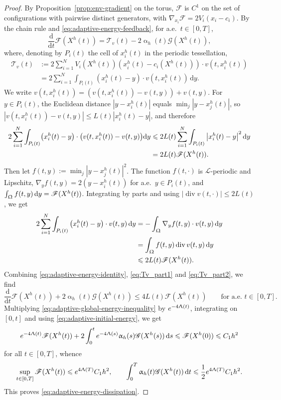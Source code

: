 \documentclass[letterpaper,11pt,twoside]{article}
\numberwithin{figure}{section}
\numberwithin{table}{section}
\theoremstyle{cpamplain}
\theoremstyle{cpamdefinition}
\newcommand{\diff}{\mathrm{d}}
\let\alpha\upalpha
\let\Lambda\Uplambda
\let\Omega\Upomega
\renewcommand{\le}{\leqslant}
\numberwithin{equation}{section}
\begin{document}
\begin{proof}
By Proposition~\ref{prop:env-gradient} on the torus, $\mathscr F$ is $C^1$ on the set of configurations with pairwise distinct generators, with $\nabla_{x_i}\mathscr F=2V_i(x_i-c_i)$.
By the chain rule and \eqref{eq:adaptive-energy-feedback}, for a.e.\ $t\in[0,T]$,
\begin{equation}\label{eq:adaptive-energy-identity}
\frac{\diff}{\diff t}\mathscr F(X^h(t))
=\mathscr T_v(t)-2\alpha_h(t)\mathscr G(X^h(t)),
\end{equation}
where, denoting by $P_i(t)$ the cell of $x_i^h(t)$ in the periodic tessellation,
\begin{align*}
\mathscr T_v(t)&:=2\sum_{i=1}^N V_i(X^h(t))\left(x_i^h(t)-c_i(X^h(t))\right)\cdot v(t,x_i^h(t))\\
&=2\sum_{i=1}^N\int_{P_i(t)}\left(x_i^h(t)-y\right)\cdot v(t,x_i^h(t))\,\diff y .
\end{align*}
We write $v(t,x_i^h(t))=(v(t,x_i^h(t))-v(t,y))+v(t,y)$.
For $y\in P_i(t)$, the Euclidean distance $|y-x_i^h(t)|$ equals $\min_j|y-x_j^h(t)|$, so $|v(t,x_i^h(t))-v(t,y)|\le L(t)|x_i^h(t)-y|$, and therefore
\begin{align}
2\sum_{i=1}^N\int_{P_i(t)}\bigl(x_i^h(t)-y\bigr)\cdot\bigl(v(t,x_i^h(t))-v(t,y)\bigr)\diff y
&\le2L(t)\sum_{i=1}^N\int_{P_i(t)}\left|x_i^h(t)-y\right|^2\diff y\notag\\
&=2L(t)\mathscr F(X^h(t)).\label{eq:Tv_part1}
\end{align}
Then let $f(t,y):=\min_j|y-x_j^h(t)|^2$.
The function $f(t,\cdot)$ is $\mathcal L$-periodic and Lipschitz, $\nabla_yf(t,y)=2(y-x_i^h(t))$ for a.e.\ $y\in P_i(t)$, and $\int_\Omega f(t,y)\,\diff y=\mathscr F(X^h(t))$.
Integrating by parts and using $|\operatorname{div}v(t,\cdot)|\le2L(t)$, we get
\begin{align}
2\sum_{i=1}^N\int_{P_i(t)}\left(x_i^h(t)-y\right)\cdot v(t,y)\,\diff y
&=-\int_\Omega\nabla_yf(t,y)\cdot v(t,y)\,\diff y\notag\\
&=\int_\Omega f(t,y)\operatorname{div}v(t,y)\,\diff y\notag\\
&\le2L(t)\mathscr F(X^h(t)).\label{eq:Tv_part2}
\end{align}
Combining \eqref{eq:adaptive-energy-identity}, \eqref{eq:Tv_part1} and \eqref{eq:Tv_part2}, we find
\begin{equation}\label{eq:adaptive-global-energy-inequality}
\frac{\diff}{\diff t}\mathscr F(X^h(t))+2\alpha_h(t)\mathscr G(X^h(t))
\le4L(t)\mathscr F(X^h(t))
\qquad\text{for a.e.\ }t\in[0,T].
\end{equation}
Multiplying \eqref{eq:adaptive-global-energy-inequality} by $e^{-4\Lambda(t)}$, integrating on $[0,t]$ and using \eqref{eq:adaptive-initial-energy}, we get
\[
e^{-4\Lambda(t)}\mathscr F(X^h(t))
+2\int_0^t e^{-4\Lambda(s)}\alpha_h(s)\mathscr G(X^h(s))\,\diff s
\le\mathscr F(X^h(0))\le C_1h^2
\]
for all $t\in[0,T]$,
whence
\begin{equation}\label{eq:energy_bounds}
\sup_{t\in[0,T]}\mathscr F(X^h(t))\le e^{4\Lambda(T)}C_1h^2,
\qquad
\int_0^T\alpha_h(t)\mathscr G(X^h(t))\,\diff t\le\frac12e^{4\Lambda(T)}C_1h^2 .
\end{equation}
This proves \eqref{eq:adaptive-energy-dissipation}.


\end{proof}
\end{document}
